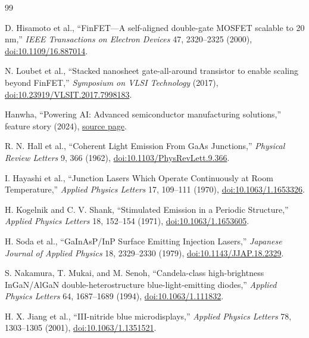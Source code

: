\documentclass[11pt]{article}
\begin{document}
\clearpage
{}
\small
\begin{thebibliography}{99}
\setlength{\itemsep}{0.18em}
\setlength{\parskip}{0pt}

D. Hisamoto et al., ``FinFET---A self-aligned double-gate MOSFET scalable to
20 nm,'' \emph{IEEE Transactions on Electron Devices} 47, 2320--2325 (2000),
\href{https://doi.org/10.1109/16.887014}{doi:10.1109/16.887014}.

N. Loubet et al., ``Stacked nanosheet gate-all-around transistor to enable
scaling beyond FinFET,'' \emph{Symposium on VLSI Technology} (2017),
\href{https://doi.org/10.23919/VLSIT.2017.7998183}{doi:10.23919/VLSIT.2017.7998183}.

Hanwha, ``Powering AI: Advanced semiconductor manufacturing solutions,''
feature story (2024),
\href{https://www.hanwha.com/newsroom/news/feature-stories/powering-ai-semiconductor-manufacturing-solutions.do}{source page}.

R. N. Hall et al., ``Coherent Light Emission From GaAs Junctions,''
\emph{Physical Review Letters} 9, 366 (1962),
\href{https://doi.org/10.1103/PhysRevLett.9.366}{doi:10.1103/PhysRevLett.9.366}.

I. Hayashi et al., ``Junction Lasers Which Operate Continuously at Room
Temperature,'' \emph{Applied Physics Letters} 17, 109--111 (1970),
\href{https://doi.org/10.1063/1.1653326}{doi:10.1063/1.1653326}.

H. Kogelnik and C. V. Shank, ``Stimulated Emission in a Periodic Structure,''
\emph{Applied Physics Letters} 18, 152--154 (1971),
\href{https://doi.org/10.1063/1.1653605}{doi:10.1063/1.1653605}.

H. Soda et al., ``GaInAsP/InP Surface Emitting Injection Lasers,''
\emph{Japanese Journal of Applied Physics} 18, 2329--2330 (1979),
\href{https://doi.org/10.1143/JJAP.18.2329}{doi:10.1143/JJAP.18.2329}.

S. Nakamura, T. Mukai, and M. Senoh, ``Candela-class high-brightness
InGaN/AlGaN double-heterostructure blue-light-emitting diodes,''
\emph{Applied Physics Letters} 64, 1687--1689 (1994),
\href{https://doi.org/10.1063/1.111832}{doi:10.1063/1.111832}.

H. X. Jiang et al., ``III-nitride blue microdisplays,'' \emph{Applied Physics
Letters} 78, 1303--1305 (2001),
\href{https://doi.org/10.1063/1.1351521}{doi:10.1063/1.1351521}.


\end{thebibliography}
\end{document}
